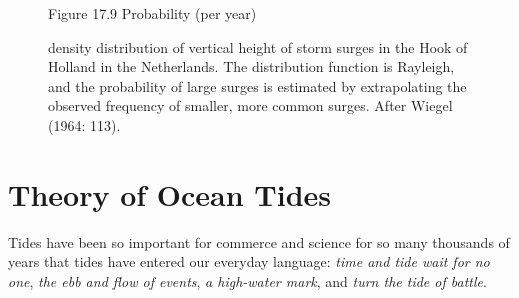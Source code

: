\begin{figure}[t!]
\footnotesize
Figure 17.9 Probability (per year) \rule{0mm}{3ex}density distribution
of vertical height of storm surges in the Hook of Holland in the
Netherlands. The distribution function is Rayleigh, and the
probability of large surges is estimated by extrapolating the observed
frequency of smaller, more common surges. After Wiegel (1964: 113).
\label{fig:surgeprob}
\vspace{-3ex}
\end{figure}

\section{Theory of Ocean Tides}
 Tides have been so important for commerce
and science for so many thousands of years that tides have entered our
everyday language: \textit{time and tide wait for no one}, \textit{the
  ebb and flow of events}, \textit{a high-water mark}, and
\textit{turn the tide of battle}.

